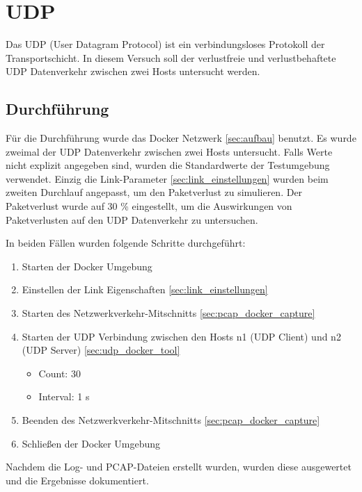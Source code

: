 \FloatBarrier
\section{UDP}
Das UDP (User Datagram Protocol) ist ein verbindungsloses Protokoll der Transportschicht.
In diesem Versuch soll der verlustfreie und verlustbehaftete UDP Datenverkehr zwischen zwei Hosts untersucht werden.

\subsection{Durchführung}
Für die Durchführung wurde das Docker Netzwerk \ref{sec:aufbau} benutzt.
Es wurde zweimal der UDP Datenverkehr zwischen zwei Hosts untersucht.
Falls Werte nicht explizit angegeben sind, wurden die Standardwerte der Testumgebung verwendet.
Einzig die Link-Parameter \ref{sec:link_einstellungen} wurden beim zweiten Durchlauf angepasst, um den Paketverlust zu simulieren.
Der Paketverlust wurde auf 30 \% eingestellt, um die Auswirkungen von Paketverlusten auf den UDP Datenverkehr zu untersuchen.

In beiden Fällen wurden folgende Schritte durchgeführt:
\begin{enumerate}
    \item Starten der Docker Umgebung
    \item Einstellen der Link Eigenschaften \ref{sec:link_einstellungen}
    \item Starten des Netzwerkverkehr-Mitschnitts \ref{sec:pcap_docker_capture}
    \item Starten der UDP Verbindung zwischen den Hosts n1 (UDP Client) und n2 (UDP Server) \ref{sec:udp_docker_tool}
    \begin{itemize}[noitemsep]
        \item Count: 30
        \item Interval: 1 s
    \end{itemize}
    \item Beenden des Netzwerkverkehr-Mitschnitts \ref{sec:pcap_docker_capture}
    \item Schließen der Docker Umgebung
\end{enumerate}

Nachdem die Log- und PCAP-Dateien erstellt wurden, wurden diese ausgewertet und die Ergebnisse dokumentiert.


